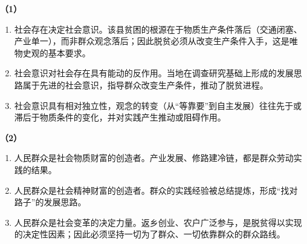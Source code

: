 
\textbf{（1）}
\begin{enumerate}[label=(\arabic*),leftmargin=2.2em,itemsep=2pt,topsep=2pt]
\item 社会存在决定社会意识。该县贫困的根源在于物质生产条件落后（交通闭塞、产业单一），而非群众观念落后；因此脱贫必须从改变生产条件入手，这是唯物史观的基本要求。
\item 社会意识对社会存在具有能动的反作用。当地在调查研究基础上形成的发展思路属于先进的社会意识，指导群众改变生产条件，推动了脱贫进程。
\item 社会意识具有相对独立性，观念的转变（从“等靠要”到自主发展）往往先于或滞后于物质条件的变化，并对实践产生推动或阻碍作用。
\end{enumerate}

\textbf{（2）}
\begin{enumerate}[label=(\arabic*),leftmargin=2.2em,itemsep=2pt,topsep=2pt]
\item 人民群众是社会物质财富的创造者。产业发展、修路建冷链，都是群众劳动实践的结果。
\item 人民群众是社会精神财富的创造者。群众的实践经验被总结提炼，形成“找对路子”的发展思路。
\item 人民群众是社会变革的决定力量。返乡创业、农户广泛参与，是脱贫得以实现的决定性因素；因此必须坚持一切为了群众、一切依靠群众的群众路线。
\end{enumerate}
